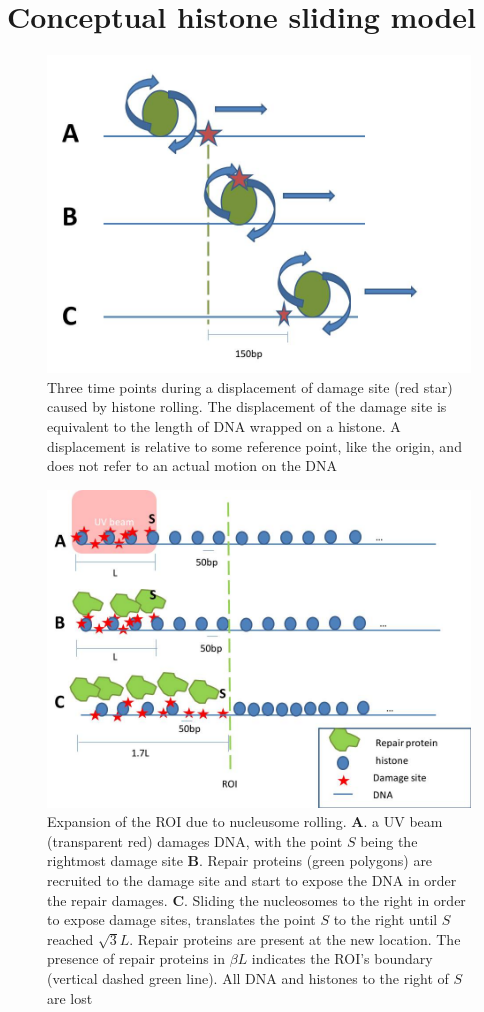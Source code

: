 \documentclass[12pt]{report}
\begin{document}
		\section{Conceptual histone sliding model}
		   \begin{figure}
		   	\centering
		   	\includegraphics[width=0.7\linewidth]{Images/SlidingModel/histoneSlidingSingle}
		   	\caption{{Three time points during a displacement of damage site (red star) caused by histone rolling. The displacement of the damage site is equivalent to the length of DNA wrapped on a histone. A displacement is relative to some reference point, like the origin, and does not refer to an actual motion on the DNA}}
		   	\label{fig:histoneSlidingSingle}
		   \end{figure}
		   
		   \begin{figure}
		   	\centering
		   	\includegraphics[width=0.7\linewidth]{Images/SlidingModel/histoneSlidingMulti}
		   	\caption{Expansion of the ROI due to nucleusome rolling. \textbf{A}. a UV beam (transparent red) damages DNA, with the point $S$ being the rightmost damage site \textbf{B}. Repair proteins (green polygons) are recruited to the damage site and start to expose the DNA in order the repair damages. \textbf{C}. Sliding the nucleosomes to the right in order to expose damage sites, translates the point $S$ to the right until $S$ reached $\sqrt{3}L$. Repair proteins are present at the new location. The presence of repair proteins in $\beta L$ indicates the ROI's boundary (vertical dashed green line). All DNA and histones to the right of $S$ are lost}
		   	\label{fig:histoneSlidingMulti}
		   \end{figure}
		   
\end{document}
